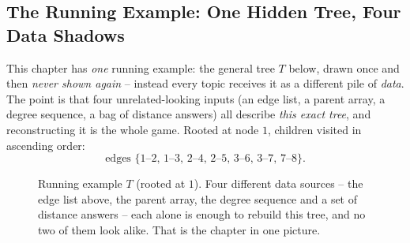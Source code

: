 \subsection*{The Running Example: One Hidden Tree, Four Data Shadows}

This chapter has \emph{one} running example: the general tree $T$ below, drawn once and then
\emph{never shown again} -- instead every topic receives it as a different pile of \emph{data}.
The point is that four unrelated-looking inputs (an edge list, a parent array, a degree sequence,
a bag of distance answers) all describe \emph{this exact tree}, and reconstructing it is the whole
game. Rooted at node $1$, children visited in ascending order:
\[
  \text{edges } \{1\text{--}2,\,1\text{--}3,\,2\text{--}4,\,2\text{--}5,\,3\text{--}6,\,3\text{--}7,\,7\text{--}8\}.
\]

\begin{figure}[H]
\centering
{}
\caption{Running example $T$ (rooted at $1$). Four different data sources -- the edge list above,
the parent array, the degree sequence and a set of distance answers -- each alone is enough to
rebuild this tree, and no two of them look alike. That is the chapter in one picture.}\label{fig:c25-running}
\end{figure}

